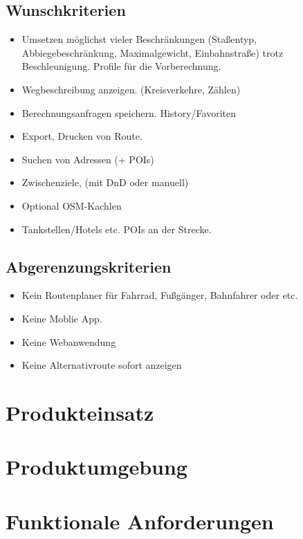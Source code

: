 \documentclass[a4paper, 11pt]{article}
\begin{document}
\subsection{Wunschkriterien}
\begin{itemize}
\item Umsetzen möglichst vieler Beschränkungen (Staßentyp, Abbiegebeschränkung, 
Maximalgewicht, Einbahnstraße) trotz Beschleunigung. Profile für die Vorberechnung.

\item Wegbeschreibung anzeigen. (Kreisverkehre, Zählen)
\item Berechnungsanfragen speichern. History/Favoriten
\item Export, Drucken von Route.

\item Suchen von Adressen (+ POIs)

\item Zwischenziele, (mit DnD oder manuell)
\item Optional OSM-Kachlen
\item Tankstellen/Hotels etc. POIs an der Strecke.
\end{itemize}
\subsection{Abgerenzungskriterien}

\begin{itemize}
\item Kein Routenplaner für Fahrrad, Fußgänger, Bahnfahrer oder etc.
\item Keine Moblie App.
\item Keine Webanwendung
\item Keine Alternativroute sofort anzeigen

\end{itemize}

\section{Produkteinsatz}
\section{Produktumgebung}
\section{Funktionale Anforderungen}
\end{document}
